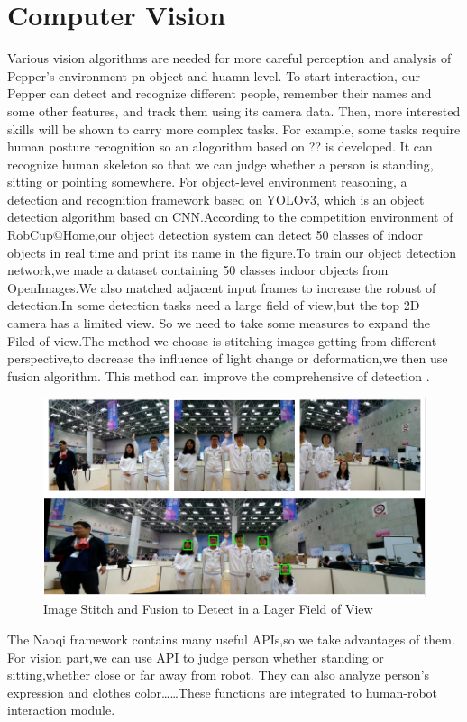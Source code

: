 \section{Computer Vision}
\label{sec:vision}
Various vision algorithms are needed for more careful perception and analysis of Pepper's environment pn object and huamn level. To start interaction, our Pepper can detect and recognize different people, remember their names and some other features, and track them using its camera data. Then, more interested skills will be shown to carry more complex tasks. For example, some tasks require human posture recognition so an alogorithm based on ?? is developed. It can recognize human skeleton so that we can judge whether a person is standing, sitting or pointing somewhere. For object-level environment reasoning, a detection and recognition framework based on YOLOv3, which is an object detection algorithm based on CNN.According to the competition environment of RobCup@Home,our object detection system can detect 50 classes of indoor objects in real time and print its name in the figure.To train our object detection network,we made a dataset containing 50 classes indoor objects from OpenImages.We also matched adjacent input frames to increase the robust of detection.In some detection tasks need a large field of view,but the top 2D camera has a limited view. So we need to take some measures to expand the Filed of view.The method we choose is stitching images getting from different perspective,to decrease the influence of light change or deformation,we then use fusion algorithm. This method can improve the comprehensive of detection .
\begin{figure}[h!]
\centering
\includegraphics[width=1.\textwidth]{figs/vision1.png}
\caption{Image Stitch and Fusion to Detect in a Lager Field of View}
\label{fig:vision1}
\end{figure}
The Naoqi framework contains many useful APIs,so we take advantages of them. For vision part,we can use API to judge person whether standing or sitting,whether close or far away from robot. They can also analyze person's expression and clothes color……These functions are integrated to human-robot interaction module.


